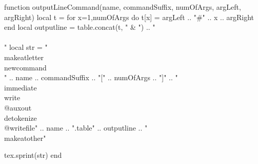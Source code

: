 \begin{luacode*}
function outputLineCommand(name, commandSuffix, numOfArgs, argLeft, argRight)
    local t = {}
    for x=1,numOfArgs do
        t[x] = argLeft .. "#" .. x .. argRight
    end
    local outputline = table.concat(t, " & ") .. "\\\\"
    local str = "\\makeatletter\\newcommand{\\" .. name .. commandSuffix .. "}[" .. numOfArgs .. "]{"
        .. "\\immediate\\write\\@auxout{\\detokenize{\\@writefile{" .. name .. ".table}{"
        .. outputline
        .. "}}}}\\makeatother"

    tex.sprint(str)
end
\end{luacode*}

\newcommand{\newcollection}[3]
{
    \immediate\write\@auxout{\detokenize{\@writefile{#1.table}{\begin{tabularx}{\textwidth}{#3}}}}
    \AtEndDocument{\immediate\write\@auxout{\detokenize{\@writefile{#1.table}{\end{tabularx}}}}}

    \luadirect{outputLineCommand("#1", "", #2, "", "")}
    \luadirect{outputLineCommand("#1", "Header", #2, "\string\\tableheader{", "}")}
    \expandafter\newcommand\csname #1RowDirect\endcsname[1]
    {
        \immediate\write\@auxout{\detokenize{\@writefile{#1.table}{##1 \\}}}
    }
    \expandafter\newcommand\csname #1WholeRow\endcsname[1]
    {
        \immediate\write\@auxout{\detokenize{\@writefile{#1.table}{\wholerow{#2}{##1} \\}}}
    }

    \expandafter\newcommand\csname #1TableOut\endcsname
    {
        \@starttoc{#1.table}
    }
}